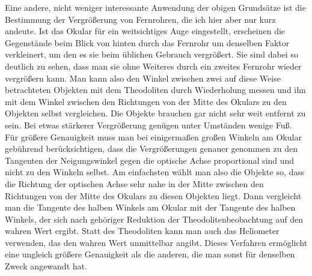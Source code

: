 Eine andere, nicht weniger interessante Anwendung der obigen Grundsätze ist die Bestimmung der Vergrößerung von Fernrohren, die ich hier aber nur kurz andeute. Ist das Okular für ein weitsichtiges Auge eingestellt, erscheinen die Gegenstände beim Blick von hinten durch das Fernrohr um denselben Faktor verkleinert, um den es sie beim üblichen Gebrauch vergrößert. Sie sind dabei so deutlich zu sehen, dass man sie ohne Weiteres durch ein zweites Fernrohr wieder vergrößern kann. Man kann also den Winkel zwischen zwei auf diese Weise betrachteten Objekten mit dem Theodoliten durch Wiederholung messen und ihn mit dem Winkel zwischen den Richtungen von der Mitte des Okulars zu den Objekten selbst vergleichen. Die Objekte brauchen gar nicht sehr weit entfernt zu sein. Bei etwas stärkerer Vergrößerung genügen unter Umständen wenige Fuß. Für größere Genauigkeit muss man bei einigermaßen großen Winkeln am Okular gebührend berücksichtigen, dass die Vergrößerungen genauer genommen zu den Tangenten der Neigungswinkel gegen die optische Achse proportional sind und nicht zu den Winkeln selbst. Am einfachsten wählt man also die Objekte so, dass die Richtung der optischen Achse sehr nahe in der Mitte zwischen den Richtungen von der Mitte des Okulars zu diesen Objekten liegt. Dann vergleicht man die Tangente des halben Winkels am Okular mit der Tangente des halben Winkels, der sich nach gehöriger Reduktion der Theodolitenbeobachtung auf den wahren Wert ergibt. Statt des Theodoliten kann man auch das Heliometer verwenden, das den wahren Wert unmittelbar angibt.
Dieses Verfahren ermöglicht eine ungleich größere Genauigkeit als die anderen, die man sonst für denselben Zweck angewandt hat.
